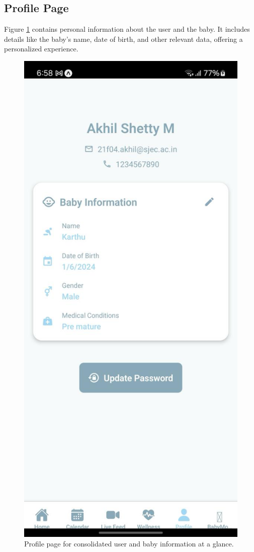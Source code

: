 \documentclass[12pt,a4paper]{report}
\begin{document}
\subsection{Profile Page}
Figure \ref{fig:profile} contains personal information about the user and the baby. It includes details like the baby’s name, date of birth, and other relevant data, offering a personalized experience.
\begin{figure}[H]
  \centering
  \includegraphics[scale=0.2]{./pic/profile.jpeg}
  \caption{Profile page for consolidated user and baby information at a glance.}
  \label{fig:profile}
\end{figure}
\end{document}
